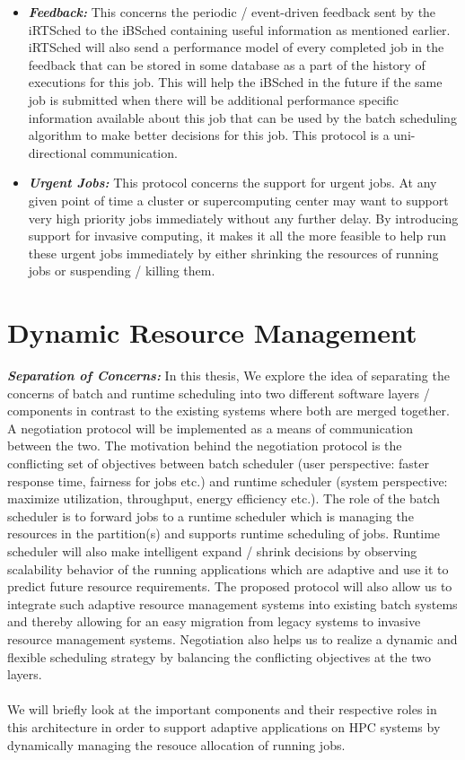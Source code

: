 \begin{itemize}
\item \textbf{\textit{Feedback:}} This concerns the periodic / event-driven feedback sent by the iRTSched to the iBSched containing useful information as mentioned earlier. iRTSched will also send a performance model of every completed job in the feedback that can be stored in some database as a part of the history of executions for this job. This will help the iBSched in the future if the same job is submitted when there will be additional performance specific information available about this job that can be used by the batch scheduling algorithm to make better decisions for this job. This protocol is a uni-directional communication.
\item \textbf{\textit{Urgent Jobs:}} This protocol concerns the support for urgent jobs. At any given point of time a cluster or supercomputing center may want to support very high priority jobs immediately without any further delay. By introducing support for invasive computing, it makes it all the more feasible to help run these urgent jobs immediately by either shrinking the resources of running jobs or suspending / killing them.
\end{itemize}
\section{Dynamic Resource Management}
\textbf{\textit{Separation of Concerns: }}In this thesis, We explore the idea of separating the concerns of batch and runtime scheduling into
two different software layers / components in contrast to the existing systems where both are merged together. A negotiation protocol will be implemented as a means of communication between the two. The motivation behind the negotiation protocol is the conflicting set of objectives between batch scheduler (user perspective: faster response time, fairness for jobs etc.) and runtime scheduler (system perspective: maximize utilization, throughput, energy efficiency etc.). The role of the batch scheduler is to forward jobs to a runtime scheduler which is managing the resources in the partition(s) and supports runtime scheduling of jobs. Runtime scheduler will also make intelligent expand / shrink decisions by observing scalability behavior of the running applications which are adaptive and use it to predict future resource requirements. The proposed protocol will also allow us to integrate such adaptive resource management systems into existing batch systems and thereby allowing for an easy migration from legacy systems to invasive resource management systems. Negotiation also helps us to realize a dynamic and flexible scheduling strategy by balancing the conflicting objectives at the two layers.\\ \\
We will briefly look at the important components and their respective roles in this architecture in order to support adaptive applications on HPC systems by dynamically managing the resouce allocation of running jobs. 
